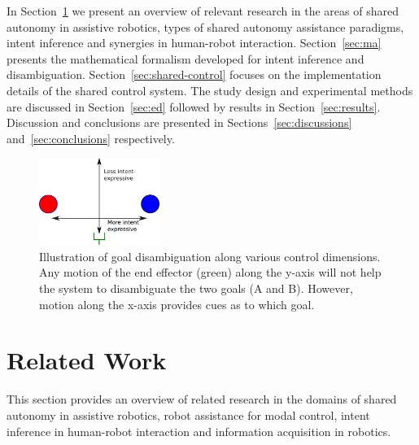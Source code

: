 In Section~\ref{sec:related-work} we present an overview of relevant research in the areas of shared autonomy in assistive robotics, types of shared autonomy assistance paradigms, intent inference and synergies in human-robot interaction. Section~\ref{sec:ma} presents the mathematical formalism developed for intent inference and disambiguation. Section~\ref{sec:shared-control} focuses on the implementation details of the shared control system. The study design and experimental methods are discussed in Section~\ref{sec:ed} followed by results in Section~\ref{sec:results}. Discussion and conclusions are presented in Sections~\ref{sec:discussions} and~\ref{sec:conclusions} respectively. 
\begin{figure}
	\begin{center}
		\includegraphics[width=0.35\textwidth]{./finalfigures/Fig2.eps}
	\end{center}
	\caption{Illustration of goal disambiguation along various control dimensions. Any motion of the end effector (green) along the y-axis will not help the system to disambiguate the two goals (A and B). However, motion along the x-axis provides cues as to which goal.}
	\label{fig:disamb}
\end{figure}


%


\section{Related Work}\label{sec:related-work}
This section provides an overview of related research in the domains of shared autonomy in assistive robotics, robot assistance for modal control, intent inference in human-robot interaction and information acquisition in robotics. 

